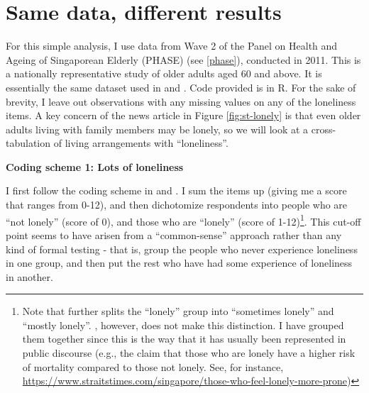 \documentclass[
  openany]{book}
\begin{document}
\hypertarget{same-data-different-results}{%
\section{Same data, different results}\label{same-data-different-results}}

For this simple analysis, I use data from Wave 2 of the Panel on Health and Ageing of Singaporean Elderly (PHASE) (see \ref{phase}), conducted in 2011. This is a nationally representative study of older adults aged 60 and above. It is essentially the same dataset used in \citet{lim_association_2017} and \citet{chan_loneliness_2015}. Code provided is in R. For the sake of brevity, I leave out observations with any missing values on any of the loneliness items. A key concern of the news article in Figure \ref{fig:st-lonely} is that even older adults living with family members may be lonely, so we will look at a cross-tabulation of living arrangements with ``loneliness''.

\textbf{Coding scheme 1: Lots of loneliness}

I first follow the coding scheme in \citet{lim_association_2017} and \citet{chan_loneliness_2015}. I sum the items up (giving me a score that ranges from 0-12), and then dichotomize respondents into people who are ``not lonely'' (score of 0), and those who are ``lonely'' (score of 1-12)\footnote{Note that \citet{chan_loneliness_2015} further splits the ``lonely'' group into ``sometimes lonely'' and ``mostly lonely''. \citet{lim_association_2017}, however, does not make this distinction. I have grouped them together since this is the way that it has usually been represented in public discourse (e.g., the claim that those who are lonely have a higher risk of mortality compared to those not lonely. See, for instance, \url{https://www.straitstimes.com/singapore/those-who-feel-lonely-more-prone})}. This cut-off point seems to have arisen from a ``common-sense'' approach rather than any kind of formal testing - that is, group the people who never experience loneliness in one group, and then put the rest who have had some experience of loneliness in another.
\end{document}
